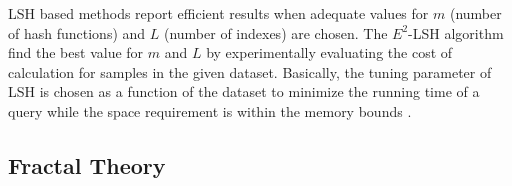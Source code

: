 \documentclass[conference]{IEEEtran}
\begin{document}
LSH based methods report efficient results when adequate values for $m$ (number of hash functions) and $L$ (number of indexes) are chosen. The $E^2$-LSH algorithm find the best value for  $m$ and $L$ by experimentally evaluating the cost of calculation for samples in the given dataset.  Basically, the tuning parameter of LSH is chosen as a function of the dataset to minimize the running time  of a query  while the space requirement is within the memory bounds \cite{LSHBook}.  %


 
 
\subsection{Fractal Theory}
 
\end{document}
